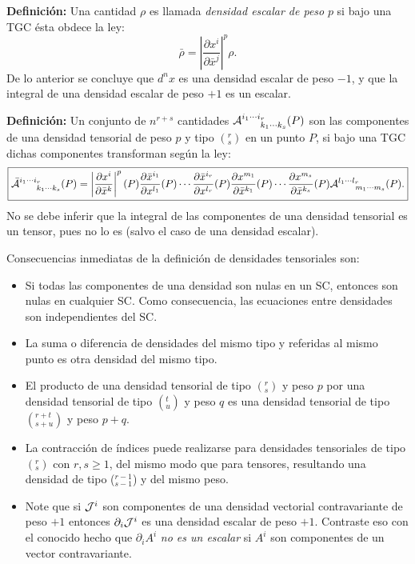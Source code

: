  \textbf{Definición:} Una cantidad $\rho$ es llamada \textit{densidad escalar
 de peso} $p$ si bajo una TGC ésta obdece la ley:
 \begin{equation}
 \bar{\rho}=\left| \frac{\partial x^i}{\partial\bar{x}^j}\right|^p%
 \rho. \label{den6}%
 \end{equation}
 De lo anterior se concluye que $d^nx$ es una densidad escalar de peso $-1$,
 y que la integral de una densidad escalar de peso $+1$ es un escalar.

 \textbf{Definición:} Un conjunto de $n^{r+s}$ cantidades ${\cal A}_{\ \ \ \ \
 k_1\cdots k_{s}}^{i_1\cdots i_{r}}(P)$ son las componentes de una densidad
 tensorial de peso $p$ y tipo $(^r_s)$ en un punto $P$, si bajo una TGC dichas
 componentes transforman según la ley:
 \begin{equation}
 \boxed{\bar{{\cal A}}_{\ \ \ \ \ k_1\cdots k_{s}}^{i_1\cdots
 i_{r}}(P)=\left| \frac{\partial
 x^i}{\partial\bar{x}^k}\right|^p(P) \frac{\partial\bar{x}^{i_1}%
}{\partial x^{l_1}}(P)\cdots \frac{\partial\bar{x}^{i_{r}}}{\partial
 x^{l_{r}}}(P)\frac{\partial x^{m_1}}{\partial\bar{x}^{k_1}}(P)\cdots
 \frac{\partial x^{m_{s}}}{\partial\bar{x}^{k_{s}}}(P){\cal A}_{\ \ \ \ \
 m_1\cdots m_{s}}^{l_1\cdots l_{r}}(P).}
 \label{den7}%
 \end{equation}
 No se debe inferir que la integral de las componentes de una densidad
 tensorial es un tensor, pues no lo es (salvo el caso de una densidad escalar).

 Consecuencias inmediatas de la definición de densidades tensoriales son:
 \begin{itemize}
 \item Si todas las componentes de una densidad son nulas en un SC, entonces
 son nulas en cualquier SC. Como consecuencia, las ecuaciones entre densidades
 son independientes del SC.
 \item La suma o diferencia de densidades del mismo tipo y referidas al mismo
 punto es otra densidad del mismo tipo.
 \item El producto de una densidad tensorial de tipo $(^r_s)$ y peso $p$ por
 una densidad tensorial de tipo $(^t_u)$ y peso $q$ es una densidad tensorial
 de tipo $(^{r+t}_{s+u})$ y peso $p+q$.
 \item La contracción de índices puede realizarse para densidades
 tensoriales de tipo $(^r_s)$ con $r,s\geq1$, del mismo modo que para tensores,
 resultando una densidad de tipo ($_{s-1}^{r-1}$) y del mismo peso.
 \item Note que si ${\cal J}^i$ son componentes de una densidad vectorial contravariante de peso $+1$ entonces $\partial_i {\cal J}^i$ es una densidad escalar de peso $+1$. Contraste eso con el conocido hecho que $\partial_iA^i$ \textit{no es un escalar} si $A^i$ son componentes de un vector contravariante.
 \end{itemize}


